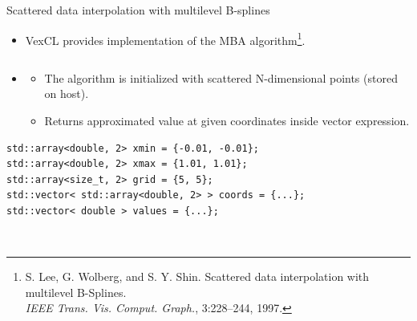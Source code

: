 \documentclass[@BEAMER_OPTIONS@]{beamer}
\begin{document}
\begin{frame}[fragile]{Scattered data interpolation with multilevel B-splines}
    \begin{itemize}
        \item VexCL provides implementation of the MBA algorithm\footnote{
                S. Lee, G. Wolberg, and S. Y. Shin.  Scattered data
                interpolation with multilevel B-Splines.\\ \quad \quad
                \emph{IEEE Trans. Vis. Comput. Graph.}, 3:228–244, 1997.}.
    \end{itemize}
    \vspace{-0.5\baselineskip}
    \begin{columns}
        \begin{column}{0.6\textwidth}
            \begin{itemize}
                \item[]
            \begin{itemize}
                \item The algorithm is initialized with scattered N-dimensional
                    points (stored on host).
                \item Returns approximated value at given coordinates inside
                    vector expression.
            \end{itemize}
            \end{itemize}
            \begin{exampleblock}{}
                \begin{lstlisting}
std::array<double, 2> xmin = {-0.01, -0.01};
std::array<double, 2> xmax = {1.01, 1.01};
std::array<size_t, 2> grid = {5, 5};
std::vector< std::array<double, 2> > coords = {...};
std::vector< double > values = {...};


\end{lstlisting}
\end{exampleblock}
\end{column}
\end{columns}
\end{frame}
\end{document}
